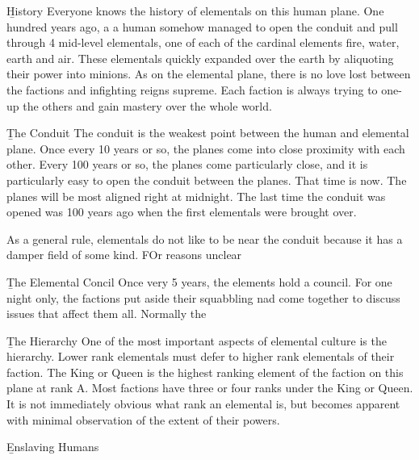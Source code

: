 \documentclass[blue]{elementals}
\begin{document}
\name{\bTest{}}

{\b{History}}
Everyone knows the history of elementals on this human plane. One hundred years ago, a a human somehow managed to open the conduit and pull through 4 mid-level elementals, one of each of the cardinal elements fire, water, earth and air. These elementals quickly expanded over the earth by aliquoting their power into minions. As on the elemental plane, there is no love lost between the factions and infighting reigns supreme. Each faction is always trying to one-up the others and gain mastery over the whole world.

{\b{The Conduit}}
The conduit is the weakest point between the human and elemental plane. Once every 10 years or so, the planes come into close proximity with each other. Every 100 years or so, the planes come particularly close, and it is particularly easy to open the conduit between the planes. That time is now. The planes will be most aligned right at midnight. The last time the conduit was opened was 100 years ago when the first elementals were brought over.

As a general rule, elementals do not like to be near the conduit because it has a damper field of some kind. FOr reasons unclear

{\b{The Elemental Concil}}
Once very 5 years, the elements hold a council. For one night only, the factions put aside their squabbling nad come together to discuss issues that affect them all. Normally the 

{\b{The Hierarchy}}
One of the most important aspects of elemental culture is the hierarchy. Lower rank elementals must defer to higher rank elementals of their faction. The King or Queen is the highest ranking element of the faction on this plane at rank A. Most factions have three or four ranks under the King or Queen. It is not immediately obvious what rank an elemental is, but becomes apparent with minimal observation of the extent of their powers.

{\b{Enslaving Humans}}
\end{document}
